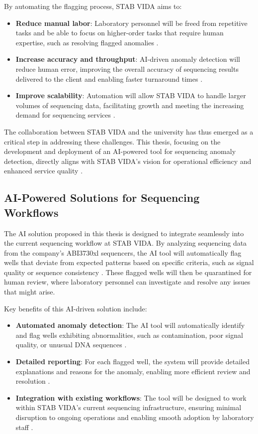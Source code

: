 By automating the flagging process, STAB VIDA aims to:

\begin{itemize} 
  \item \textbf{Reduce manual labor}: Laboratory personnel will be freed from repetitive tasks and be able to focus on higher-order tasks that require human expertise, such as resolving flagged anomalies \cite{Yang2020}. 
  \item \textbf{Increase accuracy and throughput}: AI-driven anomaly detection will reduce human error, improving the overall accuracy of sequencing results delivered to the client and enabling faster turnaround times \cite{Chen2019}. 
  \item \textbf{Improve scalability}: Automation will allow STAB VIDA to handle larger volumes of sequencing data, facilitating growth and meeting the increasing demand for sequencing services \cite{Rajendran2021}.
\end{itemize}

The collaboration between STAB VIDA and the university has thus emerged as a critical step in addressing these challenges. This thesis, focusing on the development and deployment of an AI-powered tool for sequencing anomaly detection, directly aligns with STAB VIDA’s vision for operational efficiency and enhanced service quality \cite{Sheng2018}.

\subsection{AI-Powered Solutions for Sequencing Workflows}

The AI solution proposed in this thesis is designed to integrate seamlessly into the current sequencing workflow at STAB VIDA. By analyzing sequencing data from the company's ABI3730xl sequencers, the AI tool will automatically flag wells that deviate from expected patterns based on specific criteria, such as signal quality or sequence consistency \cite{Gokcay2019}. These flagged wells will then be quarantined for human review, where laboratory personnel can investigate and resolve any issues that might arise.

Key benefits of this AI-driven solution include:

\begin{itemize} \item \textbf{Automated anomaly detection}: The AI tool will automatically identify and flag wells exhibiting abnormalities, such as contamination, poor signal quality, or unusual DNA sequences \cite{Wu2020}. \item \textbf{Detailed reporting}: For each flagged well, the system will provide detailed explanations and reasons for the anomaly, enabling more efficient review and resolution \cite{Zhang2021}. \item \textbf{Integration with existing workflows}: The tool will be designed to work within STAB VIDA’s current sequencing infrastructure, ensuring minimal disruption to ongoing operations and enabling smooth adoption by laboratory staff \cite{Chen2021}. \end{itemize}

